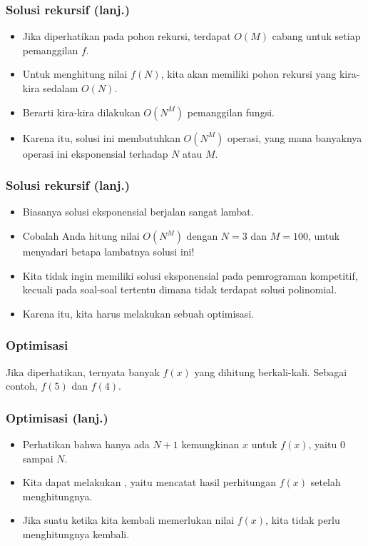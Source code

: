 \begin{frame}
\frametitle{Solusi rekursif (lanj.)}
\begin{itemize}
  \item Jika diperhatikan pada pohon rekursi, terdapat $O(M)$ cabang untuk setiap pemanggilan $f$.
  \item Untuk menghitung nilai $f(N)$, kita akan memiliki pohon rekursi yang kira-kira sedalam $O(N)$.
  \item Berarti kira-kira dilakukan $O(N^M)$ pemanggilan fungsi.
  \item Karena itu, solusi ini membutuhkan $O(N^M)$ operasi, yang mana banyaknya operasi ini eksponensial terhadap $N$ atau $M$.
\end{itemize}
\end{frame}

\begin{frame}
\frametitle{Solusi rekursif (lanj.)}
\begin{itemize}
  \item Biasanya solusi eksponensial berjalan sangat lambat.
  \item Cobalah Anda hitung nilai $O(N^M)$ dengan $N=3$ dan $M=100$, untuk menyadari betapa lambatnya solusi ini!
  \item Kita tidak ingin memiliki solusi eksponensial pada pemrograman kompetitif, kecuali pada soal-soal tertentu dimana tidak terdapat solusi polinomial. 
  \item Karena itu, kita harus melakukan sebuah optimisasi.
\end{itemize}
\end{frame}

\begin{frame}
\frametitle{Optimisasi}
Jika diperhatikan, ternyata banyak $f(x)$ yang dihitung berkali-kali. Sebagai contoh, $f(5)$ dan $f(4)$.
\begin{center}
\scalebox{0.8}{
\Tree [.$f(12)$
  [.$f(2)$
    [.$f(1)$
      [.$f(0)$ ]
    ]
  ]
  [.$f(6)$
    [.$f(0)$ ]
    [.$f(5)$
      [.$f(4)$
        [.$...$
        ]
      ]
    ]
  ]
  [.$f(11)$
    [.$f(1)$
      [.$f(0)$ ]
    ]
    [.$f(5)$
      [.$f(4)$
        [.$...$          
        ]
      ]
    ]
    [.$f(10)$ 
      [.$f(0)$ 
        [.$...$ ]      
      ]
      [.$f(4)$ 
        [.$...$ ]      
      ]
      [.$f(9)$ 
        [.$...$ ]      
      ]
    ]
  ]
]
}
\end{center}
\end{frame}

\begin{frame}
\frametitle{Optimisasi (lanj.)}
\begin{itemize}
  \item Perhatikan bahwa hanya ada $N + 1$ kemungkinan $x$ untuk $f(x)$, yaitu $0$ sampai $N$.
  
  \item Kita dapat melakukan , yaitu mencatat hasil perhitungan $f(x)$ setelah menghitungnya.
  \item Jika suatu ketika kita kembali memerlukan nilai $f(x)$, kita tidak perlu menghitungnya kembali.
\end{itemize}
\end{frame}

